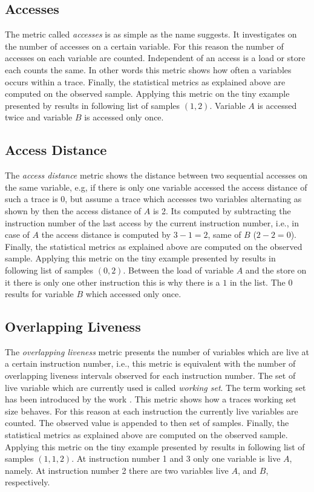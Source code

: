 \documentclass[onecolumn, openright, master, english, signatures]{dbrgrptt}
\begin{document}
\subsection{Accesses}\label{ssec:metric-accesses}
The metric called \emph{accesses} is as simple as the name suggests. It investigates on the number of accesses on a certain variable. For this reason the number of accesses on each variable are counted. Independent of an access is a load or store each counts the same. In other words this metric shows how often a variables occurs within a \ac{trace}. Finally, the statistical metrics as explained above are computed on the observed sample. Applying this metric on the tiny example presented by  results in following list of samples $(1, 2)$. Variable $A$ is accessed twice and variable $B$ is accessed only once.

\subsection{Access Distance}\label{ssec:metric-access-distance}
The \emph{access distance} metric shows the distance between two sequential accesses on the same variable, e.g, if there is only one variable accessed the access distance of such a \ac{trace} is 0, but assume a \ac{trace} which accesses two variables alternating as shown by  then the access distance of $A$ is 2. Its computed by subtracting the instruction number of the last access by the current instruction number, i.e., in case of $A$ the access distance is computed by $3-1 = 2$, same of $B$ ($2 - 2 = 0$). Finally, the statistical metrics as explained above are computed on the observed sample. Applying this metric on the tiny example presented by  results in following list of samples $(0, 2)$. Between the load of variable $A$ and the store on it there is only one other instruction this is why there is a $1$ in the list. The $0$ results for variable $B$ which accessed only once.

\subsection{Overlapping Liveness}\label{ssec:metric-concurrently-live}
The \emph{overlapping liveness} metric presents the number of variables which are live at a certain instruction number, i.e., this metric is equivalent with the number of overlapping liveness intervals observed for each instruction number. The set of live variable which are currently used is called \emph{working set}. The term working set has been introduced by the work \cite{denning1968working}. This metric shows how a \ac{trace}s working set size behaves. For this reason at each instruction the currently live variables are counted. The observed value is appended to then set of samples. Finally, the statistical metrics as explained above are computed on the observed sample. Applying this metric on the tiny example presented by  results in following list of samples $(1, 1, 2)$. At instruction number 1 and 3 only one variable is live $A$, namely. At instruction number 2 there are two variables live $A$, and $B$, respectively.
\end{document}
